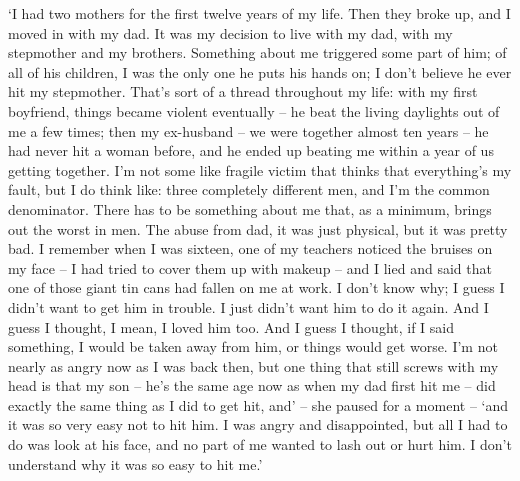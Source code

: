 `I had two mothers for the first twelve years of my life. Then they broke up, and I moved in with my dad. It was my decision to live with my dad, with my stepmother and my brothers. Something about me triggered some part of him; of all of his children, I was the only one he puts his hands on; I don't believe he ever hit my stepmother. That's sort of a thread throughout my life: with my first boyfriend, things became violent eventually -- he beat the living daylights out of me a few times; then my ex-husband -- we were together almost ten years -- he had never hit a woman before, and he ended up beating me within a year of us getting together. I'm not some like fragile victim that thinks that everything's my fault, but I do think like: three completely different men, and I'm the common denominator. There has to be something about me that, as a minimum, brings out the worst in men. The abuse from dad, it was just physical, but it was pretty bad. I remember when I was sixteen, one of my teachers noticed the bruises on my face -- I had tried to cover them up with makeup -- and I lied and said that one of those giant tin cans had fallen on me at work. I don't know why; I guess I didn't want to get him in trouble. I just didn't want him to do it again. And I guess I thought, I mean, I loved him too. And I guess I thought, if I said something, I would be taken away from him, or things would get worse. I'm not nearly as angry now as I was back then, but one thing that still screws with my head is that my son -- he's the same age now as when my dad first hit me -- did exactly the same thing as I did to get hit, and' -- she paused for a moment -- `and it was so very easy not to hit him. I was angry and disappointed, but all I had to do was look at his face, and no part of me wanted to lash out or hurt him. I don't understand why it was so easy to hit me.'

